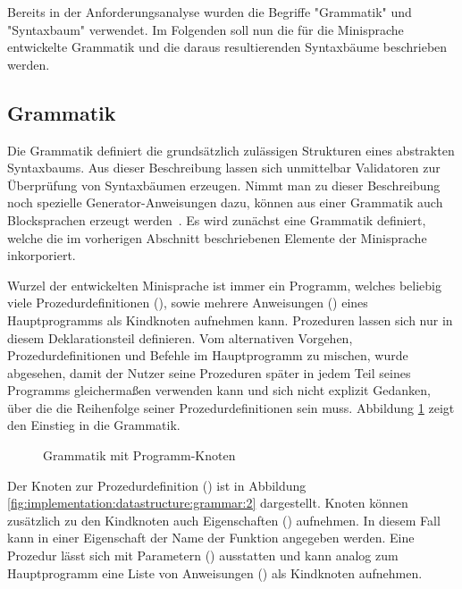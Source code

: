 Bereits in der Anforderungsanalyse wurden die Begriffe "Grammatik" und "Syntaxbaum" verwendet. Im Folgenden soll nun die für die Minisprache entwickelte Grammatik und die daraus resultierenden Syntaxbäume beschrieben werden.

\subsection{Grammatik}
\label{sec:implementation:datastructure:grammar}

Die Grammatik definiert die grundsätzlich zulässigen Strukturen eines abstrakten Syntaxbaums. Aus dieser Beschreibung lassen sich unmittelbar Validatoren zur Überprüfung von Syntaxbäumen erzeugen. Nimmt man zu dieser Beschreibung noch spezielle Ge\-ne\-ra\-tor-An\-wei\-sung\-en dazu, können aus einer Grammatik auch Blocksprachen erzeugt werden~\cite[3]{riemer2018}. Es wird zunächst eine Grammatik definiert, welche die im vorherigen Abschnitt beschriebenen Elemente der Minisprache inkorporiert.

Wurzel der entwickelten Minisprache ist immer ein Programm, welches beliebig viele Prozedurdefinitionen (), sowie mehrere Anweisungen () eines Hauptprogramms als Kindknoten aufnehmen kann. Prozeduren lassen sich nur in diesem Deklarationsteil definieren. Vom alternativen Vorgehen, Prozedurdefinitionen und Befehle im Hauptprogramm zu mischen, wurde abgesehen, damit der Nutzer seine Prozeduren später in jedem Teil seines Programms gleichermaßen verwenden kann und sich nicht explizit Gedanken, über die die Reihenfolge seiner Prozedurdefinitionen sein muss. Abbildung \ref{fig:implementation:datastructure:grammar:1} zeigt den Einstieg in die Grammatik.

\begin{figure}[h]
  
  \caption{Grammatik mit Programm-Knoten}
  \label{fig:implementation:datastructure:grammar:1}
\end{figure}

Der Knoten zur Prozedurdefinition () ist in Abbildung \ref{fig:implementation:datastructure:grammar:2} dargestellt. Knoten können zusätzlich zu den Kindknoten auch Eigenschaften () aufnehmen. In diesem Fall kann in einer Eigenschaft der Name der Funktion angegeben werden. Eine Prozedur lässt sich mit Parametern () ausstatten und kann analog zum Hauptprogramm eine Liste von Anweisungen () als Kindknoten aufnehmen.


